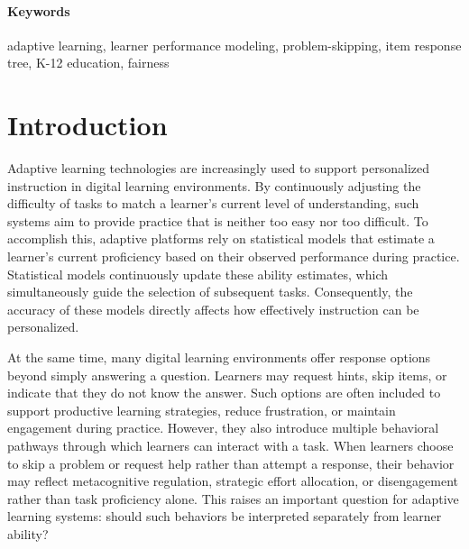 \documentclass[12pt]{article}
\begin{document}
\begin{abstract}
\end{abstract}

\paragraph{Keywords}
adaptive learning, learner performance modeling, problem-skipping, item response tree, K-12 education, fairness

\section{Introduction}

Adaptive learning technologies are increasingly used to support personalized instruction in digital learning environments. By continuously adjusting the difficulty of tasks to match a learner's current level of understanding, such systems aim to provide practice that is neither too easy nor too difficult. To accomplish this, adaptive platforms rely on statistical models that estimate a learner's current proficiency based on their observed performance during practice. Statistical models continuously update these ability estimates, which simultaneously guide the selection of subsequent tasks. Consequently, the accuracy of these models directly affects how effectively instruction can be personalized.

At the same time, many digital learning environments offer response options beyond simply answering a question. Learners may request hints, skip items, or indicate that they do not know the answer. Such options are often included to support productive learning strategies, reduce frustration, or maintain engagement during practice. However, they also introduce multiple behavioral pathways through which learners can interact with a task. When learners choose to skip a problem or request help rather than attempt a response, their behavior may reflect metacognitive regulation, strategic effort allocation, or disengagement rather than task proficiency alone. This raises an important question for adaptive learning systems: should such behaviors be interpreted separately from learner ability? 
\end{document}
